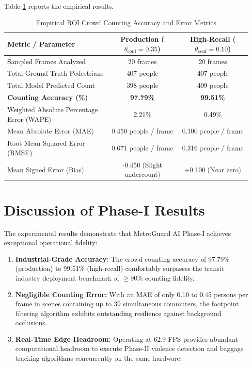 \documentclass[12pt,a4paper]{report}
\begin{document}
\noindent Table \ref{tab:count_bench} reports the empirical results.

\begin{table}[H]
\centering
\caption{Empirical ROI Crowd Counting Accuracy and Error Metrics}
\label{tab:count_bench}
\vspace*{5pt}
\begin{tabular}{|l|c|c|}
\hline
\textbf{Metric / Parameter} & \textbf{Production ($\theta_{\text{conf}} = 0.35$)} & \textbf{High-Recall ($\theta_{\text{conf}} = 0.10$)} \\ \hline
Sampled Frames Analyzed & 20 frames & 20 frames \\ \hline
Total Ground-Truth Pedestrians & 407 people & 407 people \\ \hline
Total Model Predicted Count & 398 people & 409 people \\ \hline
\textbf{Counting Accuracy (\%)} & \textbf{97.79\%} & \textbf{99.51\%} \\ \hline
Weighted Absolute Percentage Error (WAPE) & 2.21\% & 0.49\% \\ \hline
Mean Absolute Error (MAE) & 0.450 people / frame & 0.100 people / frame \\ \hline
Root Mean Squared Error (RMSE) & 0.671 people / frame & 0.316 people / frame \\ \hline
Mean Signed Error (Bias) & -0.450 (Slight undercount) & +0.100 (Near zero) \\ \hline
\end{tabular}
\end{table}

\section{Discussion of Phase-I Results}
The experimental results demonstrate that MetroGuard AI Phase-I achieves exceptional operational fidelity:
\begin{enumerate}
    \item \textbf{Industrial-Grade Accuracy:} The crowd counting accuracy of 97.79\% (production) to 99.51\% (high-recall) comfortably surpasses the transit industry deployment benchmark of $\ge 90\%$ counting fidelity.
    \item \textbf{Negligible Counting Error:} With an MAE of only 0.10 to 0.45 persons per frame in scenes containing up to 39 simultaneous commuters, the footpoint filtering algorithm exhibits outstanding resilience against background occlusions.
    \item \textbf{Real-Time Edge Headroom:} Operating at 62.9 FPS provides abundant computational headroom to execute Phase-II violence detection and baggage tracking algorithms concurrently on the same hardware.
\end{enumerate}
\end{document}
